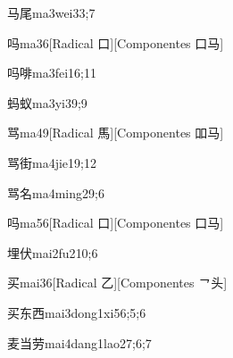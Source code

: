 \begin{verbete}{马尾}{ma3wei3}{3;7}
\end{verbete}

\begin{verbete}{吗}{ma3}{6}[Radical 口][Componentes 口马]
\end{verbete}

\begin{verbete}{吗啡}{ma3fei1}{6;11}
\end{verbete}

\begin{verbete}{蚂蚁}{ma3yi3}{9;9}
\end{verbete}

\begin{verbete}{骂}{ma4}{9}[Radical 馬][Componentes 吅马]
\end{verbete}

\begin{verbete}{骂街}{ma4jie1}{9;12}
\end{verbete}

\begin{verbete}{骂名}{ma4ming2}{9;6}
\end{verbete}

\begin{verbete}{吗}{ma5}{6}[Radical 口][Componentes 口马]
\end{verbete}

\begin{verbete}{埋伏}{mai2fu2}{10;6}
\end{verbete}

\begin{verbete}{买}{mai3}{6}[Radical 乙][Componentes ㇖头]
\end{verbete}

\begin{verbete}{买东西}{mai3dong1xi5}{6;5;6}
\end{verbete}

\begin{verbete}{麦当劳}{mai4dang1lao2}{7;6;7}
\end{verbete}

